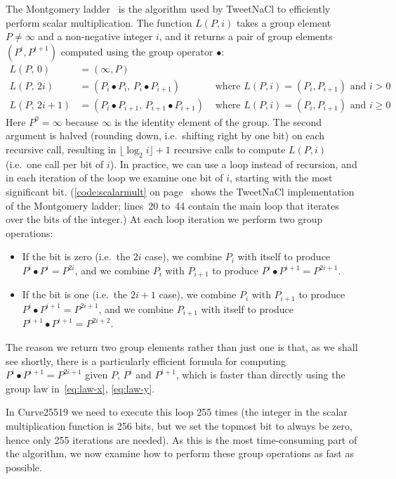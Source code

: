 \documentclass{article}
\begin{document}
The Montgomery ladder~\cite{Bernstein:2017fm,Montgomery:1987fz} is the algorithm used by TweetNaCl to efficiently perform scalar multiplication.
The function $L(P, i)$ takes a group element $P \ne \infty$ and a non-negative integer $i$, and it returns a pair of group elements $(P^i, P^{i+1})$ computed using the group operator $\bullet$:
\begin{align}
L(P,\, 0) &= (\infty, P) \label{eq:ladder}\\
L(P,\, 2i) &= (P_i \bullet P_i,\, P_i \bullet P_{i+1}) & \text{ where } L(P, i) = (P_i, P_{i+1}) \text{ and } i>0 \nonumber\\
L(P,\, 2i+1) &= (P_i \bullet P_{i+1},\, P_{i+1} \bullet P_{i+1}) & \text{ where } L(P, i) = (P_i, P_{i+1}) \text{ and } i \ge 0 \nonumber
\end{align}
Here $P^0 = \infty$ because $\infty$ is the identity element of the group.
The second argument is halved (rounding down, i.e.\ shifting right by one bit) on each recursive call, resulting in $\lfloor\log_2 i\rfloor + 1$ recursive calls to compute $L(P, i)$ (i.e.\ one call per bit of $i$).
In practice, we can use a loop instead of recursion, and in each iteration of the loop we examine one bit of $i$, starting with the most significant bit.
(\autoref{code:scalarmult} on page~\pageref{code:scalarmult} shows the TweetNaCl implementation of the Montgomery ladder; lines~20 to~44 contain the main loop that iterates over the bits of the integer.)
At each loop iteration we perform two group operations:
\begin{itemize}
\item If the bit is zero (i.e.\ the $2i$ case), we combine $P_i$ with itself to produce $P^i \bullet P^i = P^{2i}$, and we combine $P_i$ with $P_{i+1}$ to produce $P^i \bullet P^{i+1} = P^{2i+1}$.
\item If the bit is one (i.e.\ the $2i+1$ case), we combine $P_i$ with $P_{i+1}$ to produce $P^i \bullet P^{i+1} = P^{2i+1}$, and we combine $P_{i+1}$ with itself to produce $P^{i+1} \bullet P^{i+1} = P^{2i+2}$.
\end{itemize}

The reason we return two group elements rather than just one is that, as we shall see shortly, there is a particularly efficient formula for computing $P^i \bullet P^{i+1} = P^{2i+1}$ given $P$, $P^i$ and $P^{i+1}$, which is faster than directly using the group law in~\eqref{eq:law-x}, \eqref{eq:law-y}.

In Curve25519 we need to execute this loop 255 times (the integer in the scalar multiplication function is 256 bits, but we set the topmost bit to always be zero, hence only 255 iterations are needed).
As this is the most time-consuming part of the algorithm, we now examine how to perform these group operations as fast as possible.
\end{document}
